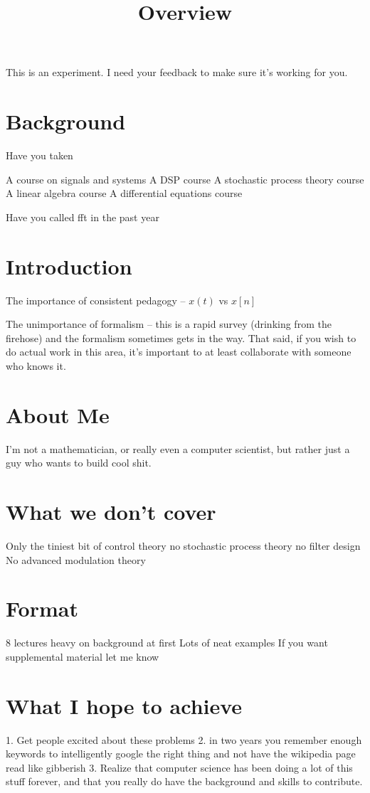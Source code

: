 

\title{Overview}

\maketitle


This is an experiment. I need your feedback to make sure it's working
for you.


\section{Background}


Have you taken

A course on signals and systems
A DSP course
A stochastic process theory course
A linear algebra course
A differential equations course

Have you called fft in the past year



\section{Introduction}
The importance of consistent pedagogy -- $x(t)$ vs $x[n]$ 

The unimportance of formalism -- this is a rapid survey (drinking from the 
firehose) and the formalism sometimes gets in the way. That said, if you
wish to do actual work in this area, it's important to at least collaborate
with someone who knows it. 

\section{About Me}
I'm not a mathematician, or really even a computer scientist, but rather
just a guy who wants to build cool shit. 

\section{What we don't cover}
Only the tiniest bit of control theory
no stochastic process theory
no filter design
No advanced modulation theory


\section{Format}
8 lectures
heavy on background at first
Lots of neat examples
If you want supplemental material let me know

\section{What I hope to achieve}
1. Get people excited about these problems
2. in two years you remember enough keywords to intelligently google the right thing and not have the wikipedia page read like gibberish
3. Realize that computer science has been doing a lot of this stuff
forever, and that you really do have the background and skills to contribute. 


